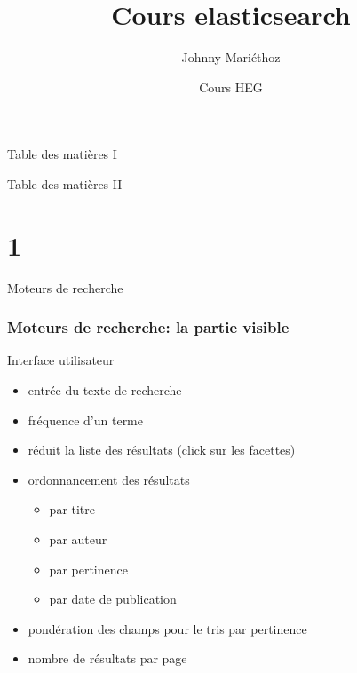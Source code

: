 \documentclass[hangout]{beamer}
\title[ES lab]{Cours elasticsearch}
\author{Johnny Mari\'ethoz}
\institute{RERO}
\date[Genève 2014]{Cours HEG}
\begin{document}
\maketitle

\begin{frame}{Table des matières I}
	\tableofcontents[part=1]
	\tableofcontents[part=2]
\end{frame}
\begin{frame}{Table des matières II}
	\tableofcontents[part=3]
	\tableofcontents[part=4]
\end{frame}

\part{1}
\begin{frame}{Moteurs de recherche}
	\tableofcontents[part=1]
\end{frame}
\section{Moteurs de recherche: la partie visible}

\begin{frame}
	\begin{block}{Interface utilisateur}
	\begin{itemize}
	    \item {} entrée du texte de recherche
	    \item {} fréquence d'un \alert{terme}
	    \item {} \alert{réduit} la liste des résultats (click sur les facettes)
	    \item {} ordonnancement des résultats
	    	\begin{itemize}
	    		\item par titre
	    		\item par auteur
	    		\item par \alert{pertinence}
	    		\item par date de publication
	    	\end{itemize}
	    \item {} pondération des champs pour le tris par pertinence
	    \item {} nombre de résultats par page
	\end{itemize}
	
	\end{block}
\end{frame}
\end{document}
